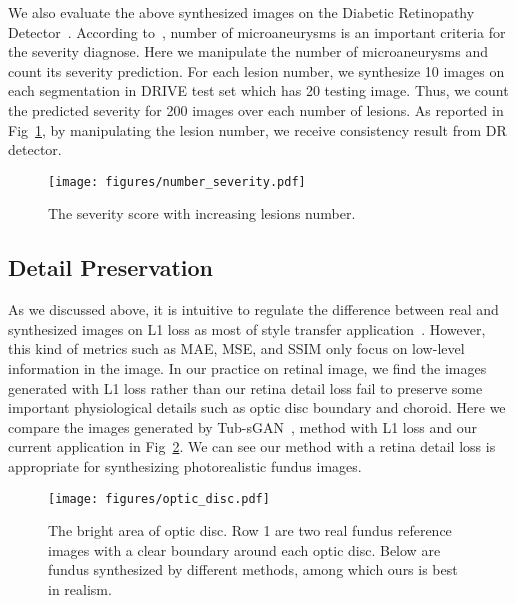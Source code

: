 \documentclass[letterpaper]{article} %
\begin{document}
  We also evaluate the above synthesized images on the Diabetic Retinopathy Detector~\cite{oO2016detector}.  According to~\cite{aao2002drscale}, number of microaneurysms is an important criteria for the severity diagnose.  Here we manipulate the number of microaneurysms and count its severity prediction. For each lesion number, we synthesize 10 images on each segmentation in DRIVE test set which has 20 testing image. Thus, we count the predicted severity for 200 images over each number of lesions. As reported in Fig~\ref{fig:number_severity}, by manipulating the lesion number, we receive consistency result from DR detector.

  	\begin{figure}[t]
		\begin{center}
			\texttt{[image: figures/number\_severity.pdf]}
		\end{center}
		\caption{The severity score with increasing lesions number.}
		\label{fig:number_severity}
	\end{figure}

    \subsection{Detail Preservation}
    \label{sec:exp_detail}

    As we discussed above, it is intuitive to regulate the difference between real and synthesized images on L1 loss as most of style transfer application~\cite{DBLP:conf/cvpr/GatysEB16}. However, this kind of metrics such as MAE, MSE, and SSIM only focus on low-level information in the image. In our practice on retinal image, we find the images generated with L1 loss rather than our retina detail loss fail to preserve some important physiological details such as optic disc boundary and choroid. Here we compare the images generated by Tub-sGAN~\cite{zhao2018synthesizing}, method with L1  loss and our current application in Fig~\ref{fig:optic_disc}.   We can see our method with a retina detail loss is appropriate for synthesizing photorealistic fundus images.

	\begin{figure}[h!]
		\begin{center}
			\texttt{[image: figures/optic\_disc.pdf]}
		\end{center}
		\caption{The bright area of optic disc. Row 1 are two real fundus reference images with a clear boundary around each optic disc. Below are fundus synthesized by different methods, among which ours is best in realism. }
		\label{fig:optic_disc}
	\end{figure}
\end{document}
